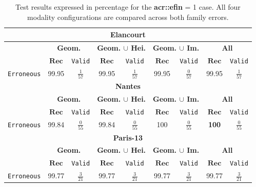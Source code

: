         \begin{table}
            \renewcommand{\arraystretch}{1.5}
            \begin{tabular}{|c | c c | c c | c c | c c |}
                \hline
                \multicolumn{9}{|c|}{\textbf{Elancourt}}\\
                \hline
                &\multicolumn{2}{c|}{\textbf{Geom.}} & \multicolumn{2}{c|}{\textbf{Geom. $\cup$ Hei.}} & \multicolumn{2}{c|}{\textbf{Geom. $\cup$ Im.}} & \multicolumn{2}{x{2.4cm}|}{\textbf{All}}\\
                \cline{2-9}
                & \(\bm{Rec}\) & \texttt{Valid} &  \(\bm{Rec}\) & \texttt{Valid} &  \(\bm{Rec}\) & \texttt{Valid} &  \(\bm{Rec}\) & \texttt{Valid} \\
                \hline
                \texttt{Erroneous} & 99.95 & $\frac{1}{57}$ & 99.95 & $\frac{1}{57}$ & 99.95 & $\frac{0}{57}$ & 99.95 & $\frac{1}{57}$ \\
                \hline
                \hline
                \multicolumn{9}{|c|}{\textbf{Nantes}}\\
                \hline
                &\multicolumn{2}{c|}{\textbf{Geom.}} & \multicolumn{2}{c|}{\textbf{Geom. $\cup$ Hei.}} & \multicolumn{2}{c|}{\textbf{Geom. $\cup$ Im.}} & \multicolumn{2}{x{2.4cm}|}{\textbf{All}}\\
                \cline{2-9}
                & \(\bm{Rec}\) & \texttt{Valid} &  \(\bm{Rec}\) & \texttt{Valid} &  \(\bm{Rec}\) & \texttt{Valid} &  \(\bm{Rec}\) & \texttt{Valid} \\
                \hline
                \texttt{Erroneous} & 99.84 & $\frac{0}{55}$ & 99.84 & $\frac{0}{55}$ & 100 & $\frac{0}{55}$ & \textbf{100} & $\frac{0}{55}$ \\
                \hline
                \hline
                \multicolumn{9}{|c|}{\textbf{Paris-13}}\\
                \hline
                &\multicolumn{2}{c|}{\textbf{Geom.}} & \multicolumn{2}{c|}{\textbf{Geom. $\cup$ Hei.}} & \multicolumn{2}{c|}{\textbf{Geom. $\cup$ Im.}} & \multicolumn{2}{x{2.4cm}|}{\textbf{All}}\\
                \cline{2-9}
                & \(\bm{Rec}\) & \texttt{Valid} &  \(\bm{Rec}\) & \texttt{Valid} &  \(\bm{Rec}\) & \texttt{Valid} &  \(\bm{Rec}\) & \texttt{Valid} \\
                \hline
                \texttt{Erroneous} & 99.77 & $\frac{3}{21}$ & 99.77 & $\frac{3}{21}$ & 99.77 & $\frac{3}{21}$ & 99.77 & $\frac{3}{21}$ \\
                \hline
            \end{tabular}
            \renewcommand{\arraystretch}{1}
            \caption{
                \label{tab::ablation_f1}
                Test results expressed in percentage for the \textbf{\gls{acr::efin}} = 1 case.
                All four modality configurations are compared across both family errors.
            }
        \end{table}
        
